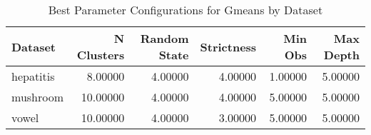\begin{table*}[ht!]
\caption{Best Parameter Configurations for Gmeans by Dataset}
\label{tab:best_configs_gmeans_config}
\begin{tabular}{lrrrrr}
Dataset & N Clusters & Random State & Strictness & Min Obs & Max Depth \\\midrule

hepatitis & 8.00000 & 4.00000 & 4.00000 & 1.00000 & 5.00000 \\
mushroom & 10.00000 & 4.00000 & 4.00000 & 5.00000 & 5.00000 \\
vowel & 10.00000 & 4.00000 & 3.00000 & 5.00000 & 5.00000 \\
\end{tabular}
\end{table*}
